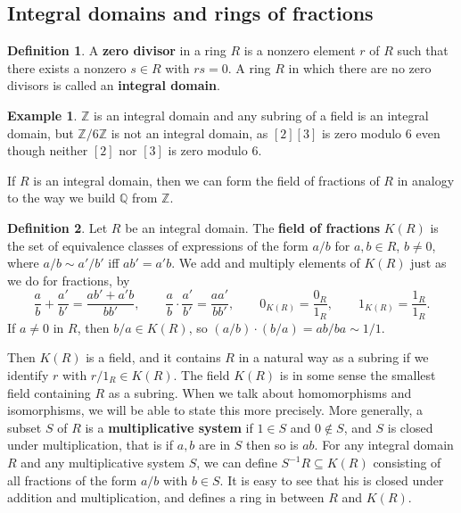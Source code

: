 \documentclass{article}
\newcommand{\Z}{\mathbb{Z}}
\newcommand{\Q}{\mathbb{Q}}
\newcommand{\rb}[1]{\left( #1 \right)}
\renewcommand{\sb}[1]{\left[ #1 \right]}
\theoremstyle{definition}\newtheorem{definition}{Definition}[section]
\theoremstyle{definition}\newtheorem{remark}[definition]{Remark}
\theoremstyle{definition}\newtheorem*{example}{Example}
\theoremstyle{definition}\newtheorem*{note}{Note}
\begin{document}

\subsection{Integral domains and rings of fractions}

\begin{definition}
A \textbf{zero divisor} in a ring $ R $ is a nonzero element $ r $ of $ R $ such that there exists a nonzero $ s \in R $ with $ rs = 0 $. A ring $ R $ in which there are no zero divisors is called an \textbf{integral domain}.
\end{definition}

\begin{example}
$ \Z $ is an integral domain and any subring of a field is an integral domain, but $ \Z / 6\Z $ is not an integral domain, as $ \sb{2}\sb{3} $ is zero modulo $ 6 $ even though neither $ \sb{2} $ nor $ \sb{3} $ is zero modulo $ 6 $.
\end{example}

If $ R $ is an integral domain, then we can form the field of fractions of $ R $ in analogy to the way we build $ \Q $ from $ \Z $.

\begin{definition}
Let $ R $ be an integral domain. The \textbf{field of fractions} $ K\rb{R} $ is the set of equivalence classes of expressions of the form $ a / b $ for $ a, b \in R $, $ b \ne 0 $, where $ a / b \sim a' / b' $ iff $ ab' = a'b $. We add and multiply elements of $ K\rb{R} $ just as we do for fractions, by
$$ \dfrac{a}{b} + \dfrac{a'}{b'} = \dfrac{ab' + a'b}{bb'}, \qquad \dfrac{a}{b} \cdot \dfrac{a'}{b'} = \dfrac{aa'}{bb'}, \qquad 0_{K\rb{R}} = \dfrac{0_R}{1_R}, \qquad 1_{K\rb{R}} = \dfrac{1_R}{1_R}. $$
If $ a \ne 0 $ in $ R $, then $ b / a \in K\rb{R} $, so $ \rb{a / b} \cdot \rb{b / a} = ab / ba \sim 1 / 1 $.
\end{definition}

Then $ K\rb{R} $ is a field, and it contains $ R $ in a natural way as a subring if we identify $ r $ with $ r / 1_R \in K\rb{R} $. The field $ K\rb{R} $ is in some sense the smallest field containing $ R $ as a subring. When we talk about homomorphisms and isomorphisms, we will be able to state this more precisely. More generally, a subset $ S $ of $ R $ is a \textbf{multiplicative system} if $ 1 \in S $ and $ 0 \notin S $, and $ S $ is closed under multiplication, that is if $ a, b $ are in $ S $ then so is $ ab $. For any integral domain $ R $ and any multiplicative system $ S $, we can define $ S^{-1}R \subseteq K\rb{R} $ consisting of all fractions of the form $ a / b $ with $ b \in S $. It is easy to see that his is closed under addition and multiplication, and defines a ring in between $ R $ and $ K\rb{R} $.
\end{document}
